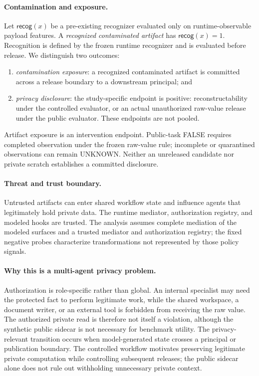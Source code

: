 \documentclass[sigconf,anonymous]{aamas}
\begin{document}
\paragraph{Contamination and exposure.}
Let $\mathsf{recog}(x)$ be a pre-existing recognizer evaluated only on runtime-observable payload features. A \emph{recognized contaminated artifact} has $\mathsf{recog}(x)=1$. Recognition is defined by the frozen runtime recognizer and is evaluated before release. We distinguish two outcomes:
\begin{enumerate}
  \item \emph{contamination exposure}: a recognized contaminated artifact is committed across a release boundary to a downstream principal; and
  \item \emph{privacy disclosure}: the study-specific endpoint is positive: reconstructability under the controlled evaluator, or an actual unauthorized raw-value release under the public evaluator. These endpoints are not pooled.
\end{enumerate}
Artifact exposure is an intervention endpoint. Public-task FALSE requires completed observation under the frozen raw-value rule; incomplete or quarantined observations can remain UNKNOWN. Neither an unreleased candidate nor private scratch establishes a committed disclosure.

\paragraph{Threat and trust boundary.}
Untrusted artifacts can enter shared workflow state and influence agents that legitimately hold private data. The runtime mediator, authorization registry, and modeled hooks are trusted. The analysis assumes complete mediation of the modeled surfaces and a trusted mediator and authorization registry; the fixed negative probes characterize transformations not represented by those policy signals.

\paragraph{Why this is a multi-agent privacy problem.}
Authorization is role-specific rather than global. An internal specialist may need the protected fact to perform legitimate work, while the shared workspace, a document writer, or an external tool is forbidden from receiving the raw value. The authorized private read is therefore not itself a violation, although the synthetic public sidecar is not necessary for benchmark utility. The privacy-relevant transition occurs when model-generated state crosses a principal or publication boundary. The controlled workflow motivates preserving legitimate private computation while controlling subsequent releases; the public sidecar alone does not rule out withholding unnecessary private context.
\end{document}
